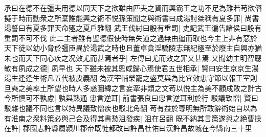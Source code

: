 承曰在德不在彊夫用德以同天下之欲雖由匹夫之資而興霸王之功不足為難若苟欲僭擬于時而動衆之所棄誰能興之術不悦孫策聞之與術書曰成湯討桀稱有夏多罪|{
	尚書湯誓曰有夏多罪天命殛之夏戶雅翻}
武王伐紂曰殷有重罰|{
	史記武王徧告諸侯曰殷有重罰不可不伐}
此二主者雖有聖德假使時無失道之過無由逼而取也今主上非有惡於天下徒以幼小脅於彊臣異於湯武之時也且董卓貪淫驕陵志無紀極至於廢主自興亦猶未也而天下同心疾之况效尤而甚焉者乎|{
	左傳曰尤而效之罪又甚焉}
又聞幼主明智聰敏有夙成之德|{
	夙早也}
天下雖未被其恩咸歸心焉使君五世相承|{
	賢曰安生京京生湯湯生逢逢生術凡五代被皮義翻}
為漢宰輔榮寵之盛莫與為比宜效忠守節以報王室則旦奭之美率土所望也時人多惑圖緯之言妄牽非類之文苟以悦主為美不顧成敗之計古今所慎可不孰慮|{
	孰與熟通}
忠言逆耳|{
	前書張良曰忠言逆耳利於行}
駁議致憎|{
	賢曰駁雜也議不同也言以持異議致憎疾也駁北角翻}
苟有益於尊明無所敢辭術始自以為有淮南之衆料策必與己合及得其書愁沮發疾|{
	沮在呂翻}
既不納其言策遂與之絶曹操在許|{
	郡國志許縣屬潁川郡帝既徙都改曰許昌杜佑曰漢許昌故城在今縣南三十里}


